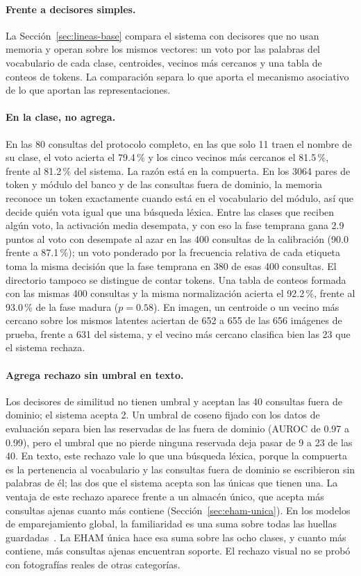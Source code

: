 \paragraph{Frente a decisores simples.}
La Sección~\ref{sec:lineas-base} compara el sistema con decisores que no usan memoria y
operan sobre los mismos vectores: un voto por las palabras del vocabulario de cada
clase, centroides, vecinos más cercanos y una tabla de conteos de tokens.
La comparación separa lo que aporta el mecanismo asociativo de lo que aportan las
representaciones.

\paragraph{En la clase, no agrega.}
En las 80 consultas del protocolo completo, en las que solo 11 traen el nombre de su
clase, el voto acierta el 79.4\,\% y los cinco vecinos más cercanos el 81.5\,\%, frente
al 81.2\,\% del sistema.
La razón está en la compuerta.
En los 3064 pares de token y módulo del banco y de las consultas fuera de dominio, la
memoria reconoce un token exactamente cuando está en el vocabulario del módulo, así que
decide quién vota igual que una búsqueda léxica.
Entre las clases que reciben algún voto, la activación media desempata, y con eso la
fase temprana gana 2.9 puntos al voto con desempate al azar en las 400 consultas de la
calibración (90.0 frente a 87.1\,\%); un voto ponderado por la frecuencia relativa de
cada etiqueta toma la misma decisión que la fase temprana en 380 de esas 400 consultas.
El directorio tampoco se distingue de contar tokens.
Una tabla de conteos formada con las mismas 400 consultas y la misma normalización
acierta el 92.2\,\%, frente al 93.0\,\% de la fase madura ($p = 0.58$).
En imagen, un centroide o un vecino más cercano sobre los mismos latentes aciertan de
652 a 655 de las 656 imágenes de prueba, frente a 631 del sistema, y el vecino más
cercano clasifica bien las 23 que el sistema rechaza.

\paragraph{Agrega rechazo sin umbral en texto.}
Los decisores de similitud no tienen umbral y aceptan las 40 consultas fuera de dominio;
el sistema acepta 2.
Un umbral de coseno fijado con los datos de evaluación separa bien las reservadas de las
fuera de dominio (AUROC de 0.97 a 0.99), pero el umbral que no pierde ninguna reservada
deja pasar de 9 a 23 de las 40.
En texto, este rechazo vale lo que una búsqueda léxica, porque la compuerta es la
pertenencia al vocabulario y las consultas fuera de dominio se escribieron sin palabras
de él; las dos que el sistema acepta son las únicas que tienen una.
La ventaja de este rechazo aparece frente a un almacén único, que acepta más consultas
ajenas cuanto más contiene (Sección~\ref{sec:eham-unica}).
En los modelos de emparejamiento global, la familiaridad es una suma sobre todas las
huellas guardadas~\cite{clark1996global}.
La EHAM única hace esa suma sobre las ocho clases, y cuanto más contiene, más consultas
ajenas encuentran soporte.
El rechazo visual no se probó con fotografías reales de otras categorías.

